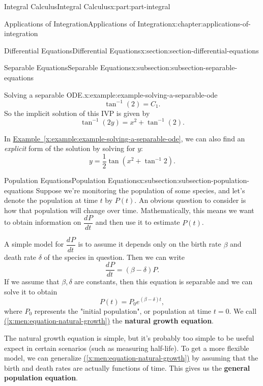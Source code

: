 \documentclass[twoside,10pt,]{book}
\newcommand{\xreffont}{\relax}
\newcommand{\terminology}[1]{\textbf{#1}}
\numberwithin{equation}{part}
\newcommand{\dv}[3][]{\dfrac{d^{#1} #2}{d #3^{#1}}}
\begin{document}
\begin{partptx}{Integral Calculus}{}{Integral Calculus}{}{}{x:part:part-integral}
\begin{chapterptx}{Applications of Integration}{}{Applications of Integration}{}{}{x:chapter:applications-of-integration}
\begin{sectionptx}{Differential Equations}{}{Differential Equations}{}{}{x:section:section-differential-equations}
\begin{subsectionptx}{Separable Equations}{}{Separable Equations}{}{}{x:subsection:subsection-separable-equations}
\begin{example}{Solving a separable ODE.}{x:example:example-solving-a-separable-ode}
\begin{equation*}
\tan^{-1}(2) = C_{1}.
\end{equation*}
So the implicit solution of this IVP is given by%
\begin{equation*}
\tan^{-1}(2y) = x^{2}+\tan^{-1}(2).
\end{equation*}
%
\end{example}
In \hyperref[x:example:example-solving-a-separable-ode]{Example~{\xreffont\ref{x:example:example-solving-a-separable-ode}}}, we can also find an \emph{explicit} form of the solution by solving for \(y\):%
\begin{equation*}
y = \frac{1}{2}\tan(x^{2} + \tan^{-1}2).
\end{equation*}
%
\end{subsectionptx}
%
%
\typeout{************************************************}
\typeout{************************************************}
%
\begin{subsectionptx}{Population Equations}{}{Population Equations}{}{}{x:subsection:subsection-population-equations}
Suppose we're monitoring the population of some species, and let's denote the population at time \(t\) by \(P(t)\). An obvious question to consider is how that population will change over time. Mathematically, this means we want to obtain information on \(\dv{P}{t}\) and then use it to estimate \(P(t)\).%
\par
A simple model for \(\dv{P}{t}\) is to assume it depends only on the birth rate \(\beta\) and death rate \(\delta\) of the species in question. Then we can write%
\begin{equation}
\dv{P}{t} = (\beta - \delta)P.\label{x:men:equation-natural-growth}
\end{equation}
If we assume that \(\beta,\delta\) are constants, then this equation is separable and we can solve it to obtain%
\begin{equation*}
P(t) = P_{0}e^{(\beta - \delta)t},
\end{equation*}
where \(P_{0}\) represents the "initial population", or population at time \(t = 0\). We call \hyperref[x:men:equation-natural-growth]{({\xreffont\ref{x:men:equation-natural-growth}})} the \terminology{natural growth equation}.%
\par
The natural growth equation is simple, but it's probably too simple to be useful expect in certain scenarios (such as measuring half-life). To get a more flexible model, we can generalize \hyperref[x:men:equation-natural-growth]{({\xreffont\ref{x:men:equation-natural-growth}})} by assuming that the birth and death rates are actually functions of time. This gives us the \terminology{general population equation}.%

\end{subsectionptx}
\end{sectionptx}
\end{chapterptx}
\end{partptx}
\end{document}
